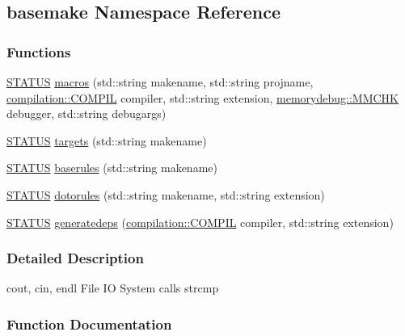 \hypertarget{namespacebasemake}{}\subsection{basemake Namespace Reference}
\label{namespacebasemake}
\subsubsection*{Functions}
\begin{DoxyCompactItemize}
\item 
\mbox{\hyperlink{functions_8h_a32c27cc471df37f4fc818d65de0a56c4}{S\+T\+A\+T\+US}} \mbox{\hyperlink{namespacebasemake_acea7aefc8d03ec10fff9a8c76063bda9}{macros}} (std\+::string makename, std\+::string projname, \mbox{\hyperlink{namespacecompilation_ab8b552e73f4f5a4912982468f052f089}{compilation\+::\+C\+O\+M\+P\+IL}} compiler, std\+::string extension, \mbox{\hyperlink{namespacememorydebug_a83a201aba3c4913d2e0cca3e6f38c44f}{memorydebug\+::\+M\+M\+C\+HK}} debugger, std\+::string debugargs)
\item 
\mbox{\hyperlink{functions_8h_a32c27cc471df37f4fc818d65de0a56c4}{S\+T\+A\+T\+US}} \mbox{\hyperlink{namespacebasemake_a6731aef50bd4fe975aeed98a4e9373d4}{targets}} (std\+::string makename)
\item 
\mbox{\hyperlink{functions_8h_a32c27cc471df37f4fc818d65de0a56c4}{S\+T\+A\+T\+US}} \mbox{\hyperlink{namespacebasemake_a7fc24e7fc7f5c6fcc0f4454c1b6ef9ef}{baserules}} (std\+::string makename)
\item 
\mbox{\hyperlink{functions_8h_a32c27cc471df37f4fc818d65de0a56c4}{S\+T\+A\+T\+US}} \mbox{\hyperlink{namespacebasemake_a63c4ae79b21dd71b111589322b888167}{dotorules}} (std\+::string makename, std\+::string extension)
\item 
\mbox{\hyperlink{functions_8h_a32c27cc471df37f4fc818d65de0a56c4}{S\+T\+A\+T\+US}} \mbox{\hyperlink{namespacebasemake_a0dfd9121ee780c0faaf7eb9ac4c58d63}{generatedeps}} (\mbox{\hyperlink{namespacecompilation_ab8b552e73f4f5a4912982468f052f089}{compilation\+::\+C\+O\+M\+P\+IL}} compiler, std\+::string extension)
\end{DoxyCompactItemize}


\subsubsection{Detailed Description}
cout, cin, endl File IO System calls strcmp 

\subsubsection{Function Documentation}
\mbox{\label{namespacebasemake_a7fc24e7fc7f5c6fcc0f4454c1b6ef9ef}} 
